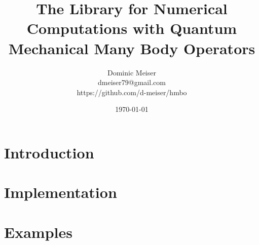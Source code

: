 \documentclass[11pt]{report}
\title{The \hmbo{} Library for Numerical Computations with Quantum
  Mechanical Many Body Operators}
\author{Dominic Meiser\\
  dmeiser79@gmail.com\\
  https://github.com/d-meiser/hmbo}
\date{\today}
\begin{document}
\maketitle

\tableofcontents


\chapter{Introduction}
\label{ch:Introduction}


\chapter{Implementation}
\label{ch:Implementation}






\chapter{Examples}
\label{ch:Examples}



\end{document}
